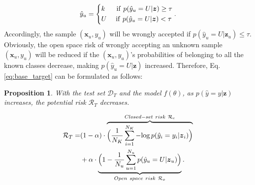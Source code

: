 \documentclass[letterpaper]{article} %
\newtheorem{proposition}{Proposition}
\begin{document}
\begin{equation}
\hat{y}_u=\left\{\begin{aligned}  
        &k\ \ \quad{\rm{if}}\ p(\hat{y}_u=U|\boldsymbol{z})\geq\tau\\  
        &U\,\,\quad{\rm{if}}\ p(\hat{y}_u=U|\boldsymbol{z})<\tau  
    \end{aligned}\right..
\label{eq:rej_unknown}
\end{equation}
Accordingly, the sample $(\boldsymbol{x}_u,y_u)$ will be wrongly accepted if $p(\hat{y}_u=U|\boldsymbol{z}_u)\leq\tau$.
Obviously, the open space risk of wrongly accepting an unknown sample $(\boldsymbol{x}_u,y_u)$ will be reduced if the $(\boldsymbol{x}_u,y_u)$'s probabilities of belonging to all the known classes decrease, making
$p(\hat{y}_u=U|\boldsymbol{z})$ increased. Therefore, Eq. \eqref{eq:base_target} can be formulated as follows:

\begin{proposition}  
With the test set $\mathcal{D}_T$ and the model $f(\theta)$, as $p(\hat{y}=y|\boldsymbol{z})$ increases, the potential risk $\mathcal{R}_T$ decreases.
\end{proposition} 

\begin{equation}
\begin{aligned}
\mathcal{R}_T=&(1-\alpha)\cdot\overbrace{\Big(\frac1{N_K}\sum^{N_K}_{i=1}-{\rm log}\,p(\hat{y}_i=y_i|\boldsymbol{z}_i)\Big)}^{Closed-set\ risk\ \mathcal{R}_c}\\&+\alpha\cdot\underbrace{\Big(1-\frac{1}{N_u}\sum_{u=1}^{N_u}p(\hat{y}_u=U|\boldsymbol{z}_u)\Big)}_{Open\ space\ risk\ \mathcal{R}_o}.
\label{eq:potential_risk}
\end{aligned}
\end{equation}
\end{document}
